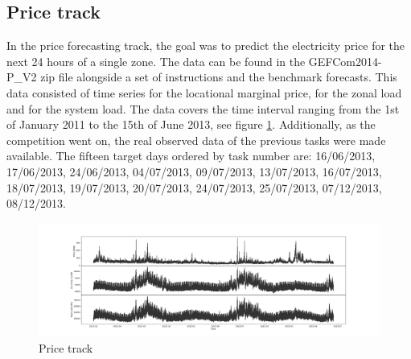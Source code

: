 \subsection{Price track}
In the price forecasting track, the goal was to predict the electricity price for the next 24 hours of a single zone. 
The data can be found in the GEFCom2014-P\_V2 zip file alongside a set of instructions and the benchmark forecasts.
This data consisted of time series for the locational marginal price, for the zonal load and for the system load. The data covers the time interval ranging from the 1st of January 2011 to the 15th of June 2013, see figure \ref{fig:price_track_fig1}. 
Additionally, as the competition went on, the real observed data of the previous tasks were made available.
The fifteen target days ordered by task number are: 16/06/2013, 17/06/2013, 24/06/2013, 04/07/2013, 09/07/2013, 13/07/2013, 16/07/2013, 18/07/2013, 19/07/2013, 20/07/2013, 24/07/2013, 25/07/2013, 07/12/2013, 08/12/2013. 
\begin{figure}[!h]
    \includegraphics[width=\textwidth]{images/price_track_fig1.png}
    \caption{Price track}
    \label{fig:price_track_fig1}
\end{figure}
